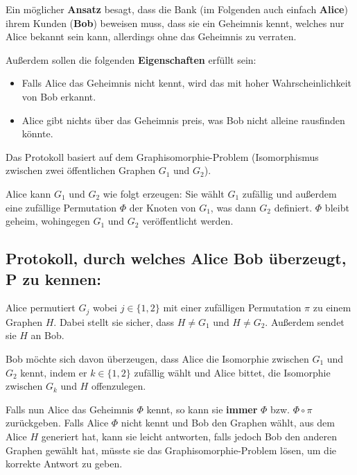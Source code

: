 \documentclass{scrartcl}%
\begin{document}
    Ein möglicher \textbf{\textsf{Ansatz}} besagt, dass die Bank (im Folgenden auch einfach \textbf{\textsf{Alice}})
    ihrem Kunden (\textbf{\textsf{Bob}}) beweisen muss, dass sie ein Geheimnis kennt, welches nur Alice bekannt sein kann,
    allerdings ohne das Geheimnis zu verraten.

    Außerdem sollen die folgenden \textbf{\textsf{Eigenschaften}} erfüllt sein:

    \begin{itemize}
        \item Falls Alice das Geheimnis nicht kennt, wird das mit hoher Wahrscheinlichkeit von Bob erkannt.
        \item Alice gibt nichts über das Geheimnis preis, was Bob nicht alleine rausfinden könnte.
    \end{itemize}

    Das Protokoll basiert auf dem Graphisomorphie-Problem (Isomorphismus zwischen zwei öffentlichen Graphen $G_1$ und $G_2$).

    Alice kann $G_1$ und $G_2$ wie folgt erzeugen: Sie wählt $G_1$ zufällig und außerdem eine zufällige Permutation $\Phi$ der Knoten von $G_1$, was dann $G_2$ definiert.
    $\Phi$ bleibt geheim, wohingegen $G_1$ und $G_2$ veröffentlicht werden.
    \newline
    \newline
    \subsection*{Protokoll, durch welches Alice Bob überzeugt, P zu kennen:}
    \newline
    \newline
    Alice permutiert $G_{j}$ wobei $j \in \{1,2\}$ mit einer zufälligen Permutation $\pi$ zu einem Graphen $H$.
    Dabei stellt sie sicher, dass $H\neq G_1$ und $H\neq G_2$.
    Außerdem sendet sie $H$ an Bob.

    Bob möchte sich davon überzeugen, dass Alice die Isomorphie zwischen $G_1$ und $G_2$ kennt,
    indem er $k \in \{1,2\}$ zufällig wählt und Alice bittet, die Isomorphie zwischen $G_k$ und $H$ offenzulegen.

    Falls nun Alice das Geheimnis $\Phi$ kennt, so kann sie \textbf{\textsf{immer}} $\Phi$ bzw. $\Phi \circ \pi$ zurückgeben.
    Falls Alice $\Phi$ nicht kennt und Bob den Graphen wählt, aus dem Alice $H$ generiert hat,
    kann sie leicht antworten, falls jedoch Bob den anderen Graphen gewählt hat,
    müsste sie das Graphisomorphie-Problem lösen, um die korrekte Antwort zu geben.
\end{document}
